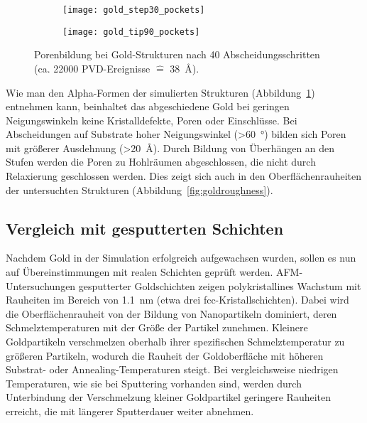 \begin{figure}
  \captionsetup[subfigure]{singlelinecheck=false}
  \def\subfigwidth{0.49\textwidth}

  \begin{subfigure}[t]{\subfigwidth}
    \texttt{[image: gold\_step30\_pockets]}
    \label{fig:goldpockets-a}
  \end{subfigure}
  \hfill
  \begin{subfigure}[t]{\subfigwidth}
    \texttt{[image: gold\_tip90\_pockets]}
    \label{fig:goldpockets-b}
  \end{subfigure}

  \caption[Porenbildung bei Gold-Strukturen]{Porenbildung bei Gold-Strukturen nach 40 Abscheidungsschritten (ca. \num{22000} PVD-Ereignisse $\hat{=}$ \SI{38}{\angstrom}).
  }
  \label{fig:goldpockets}
\end{figure}

Wie man den Alpha-Formen der simulierten Strukturen (Abbildung~\ref{fig:goldpockets-a}) entnehmen kann, beinhaltet das abgeschiedene Gold bei geringen Neigungswinkeln keine Kristalldefekte, Poren oder Einschlüsse.
Bei Abscheidungen auf Substrate hoher Neigungswinkel (>\SI{60}{\degree}) bilden sich Poren mit größerer Ausdehnung (>\SI{20}{\angstrom}).
Durch Bildung von Überhängen an den Stufen werden die Poren zu Hohlräumen abgeschlossen, die nicht durch Relaxierung geschlossen werden.
Dies zeigt sich auch in den Oberflächenrauheiten der untersuchten Strukturen (Abbildung~\ref{fig:goldroughness}).

\subsection{Vergleich mit gesputterten Schichten}

Nachdem Gold in der Simulation erfolgreich aufgewachsen wurden, sollen es nun auf Übereinstimmungen mit realen Schichten geprüft werden.
AFM-Untersuchungen gesputterter Goldschichten zeigen polykristallines Wachstum mit Rauheiten im Bereich von \SI{1.1}{\nano\meter} (etwa drei fcc-Kristallschichten)\cite{svorcik_annealing_2011}.
Dabei wird die Oberflächenrauheit von der Bildung von Nanopartikeln dominiert, deren Schmelztemperaturen mit der Größe der Partikel zunehmen\cite{liu_melting_2001}.
Kleinere Goldpartikeln verschmelzen oberhalb ihrer spezifischen Schmelztemperatur zu größeren Partikeln, wodurch die Rauheit der Goldoberfläche mit höheren Substrat- oder Annealing-Temperaturen steigt.
Bei vergleichsweise niedrigen Temperaturen, wie sie bei Sputtering vorhanden sind, werden durch Unterbindung der Verschmelzung kleiner Goldpartikel geringere Rauheiten erreicht, die mit längerer Sputterdauer weiter abnehmen\cite{svorcik_annealing_2011}.

